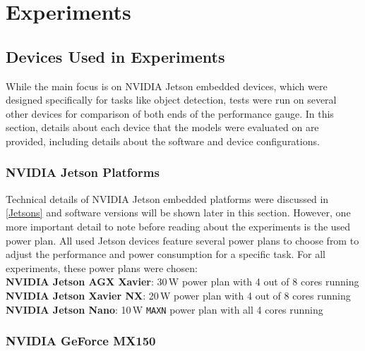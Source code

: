 




\chapter{Experiments}
\label{Experiments}


\section{Devices Used in Experiments}

While the main focus is on NVIDIA Jetson embedded devices, which were designed
specifically for tasks like object detection, tests were run on several other
devices for comparison of both ends of the performance gauge. In this section,
details about each device that the models were evaluated on are provided,
including details about the software and device configurations.


\subsection{NVIDIA Jetson Platforms}

Technical details of NVIDIA Jetson embedded platforms were discussed in
\autoref{Jetsons} and software versions will be shown later in this section.
However, one more important detail to note before reading about the experiments
is the used power plan. All used Jetson devices feature several power plans to
choose from to adjust the performance and power consumption for a specific task.
For all experiments, these power plans were chosen: \\
\textbf{NVIDIA Jetson AGX Xavier}: 30\,W power plan with 4 out of 8 cores running \\
\textbf{NVIDIA Jetson Xavier NX}: 20\,W power plan with 4 out of 8 cores running \\
\textbf{NVIDIA Jetson Nano}: 10\,W \texttt{MAXN} power plan with all 4 cores running


\subsection{NVIDIA GeForce MX150}

